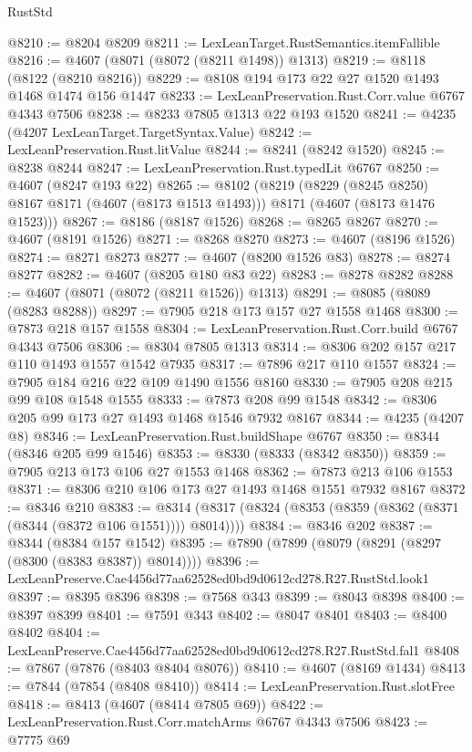 \begin{lexlean}{RustStd}
\begin{coremodule}
@8210 := @8204 @8209
@8211 := LexLeanTarget.RustSemantics.itemFallible
@8216 := @4607 (@8071 (@8072 (@8211 @1498)) @1313)
@8219 := @8118 (@8122 (@8210 @8216))
@8229 := @8108 @194 @173 @22 @27 @1520 @1493 @1468 @1474 @156 @1447
@8233 := LexLeanPreservation.Rust.Corr.value @6767 @4343 @7506
@8238 := @8233 @7805 @1313 @22 @193 @1520
@8241 := @4235 (@4207 LexLeanTarget.TargetSyntax.Value)
@8242 := LexLeanPreservation.Rust.litValue
@8244 := @8241 (@8242 @1520)
@8245 := @8238 @8244
@8247 := LexLeanPreservation.Rust.typedLit @6767
@8250 := @4607 (@8247 @193 @22)
@8265 := @8102
    (@8219
      (@8229 (@8245 @8250) @8167 @8171 (@4607 (@8173 @1513 @1493)))
      @8171
      (@4607 (@8173 @1476 @1523)))
@8267 := @8186 (@8187 @1526)
@8268 := @8265 @8267
@8270 := @4607 (@8191 @1526)
@8271 := @8268 @8270
@8273 := @4607 (@8196 @1526)
@8274 := @8271 @8273
@8277 := @4607 (@8200 @1526 @83)
@8278 := @8274 @8277
@8282 := @4607 (@8205 @180 @83 @22)
@8283 := @8278 @8282
@8288 := @4607 (@8071 (@8072 (@8211 @1526)) @1313)
@8291 := @8085 (@8089 (@8283 @8288))
@8297 := @7905 @218 @173 @157 @27 @1558 @1468
@8300 := @7873 @218 @157 @1558
@8304 := LexLeanPreservation.Rust.Corr.build @6767 @4343 @7506
@8306 := @8304 @7805 @1313
@8314 := @8306 @202 @157 @217 @110 @1493 @1557 @1542 @7935
@8317 := @7896 @217 @110 @1557
@8324 := @7905 @184 @216 @22 @109 @1490 @1556 @8160
@8330 := @7905 @208 @215 @99 @108 @1548 @1555
@8333 := @7873 @208 @99 @1548
@8342 := @8306 @205 @99 @173 @27 @1493 @1468 @1546 @7932 @8167
@8344 := @4235 (@4207 @8)
@8346 := LexLeanPreservation.Rust.buildShape @6767
@8350 := @8344 (@8346 @205 @99 @1546)
@8353 := @8330 (@8333 (@8342 @8350))
@8359 := @7905 @213 @173 @106 @27 @1553 @1468
@8362 := @7873 @213 @106 @1553
@8371 := @8306 @210 @106 @173 @27 @1493 @1468 @1551 @7932 @8167
@8372 := @8346 @210
@8383 := @8314 (@8317 (@8324 (@8353 (@8359 (@8362 (@8371 (@8344 (@8372 @106 @1551)))) @8014))))
@8384 := @8346 @202
@8387 := @8344 (@8384 @157 @1542)
@8395 := @7890 (@7899 (@8079 (@8291 (@8297 (@8300 (@8383 @8387)) @8014))))
@8396 := LexLeanPreserve.Cae4456d77aa62528ed0bd9d0612cd278.R27.RustStd.look1
@8397 := @8395 @8396
@8398 := @7568 @343
@8399 := @8043 @8398
@8400 := @8397 @8399
@8401 := @7591 @343
@8402 := @8047 @8401
@8403 := @8400 @8402
@8404 := LexLeanPreserve.Cae4456d77aa62528ed0bd9d0612cd278.R27.RustStd.fal1
@8408 := @7867 (@7876 (@8403 @8404 @8076))
@8410 := @4607 (@8169 @1434)
@8413 := @7844 (@7854 (@8408 @8410))
@8414 := LexLeanPreservation.Rust.slotFree
@8418 := @8413 (@4607 (@8414 @7805 @69))
@8422 := LexLeanPreservation.Rust.Corr.matchArms @6767 @4343 @7506
@8423 := @7775 @69

\end{coremodule}
\end{lexlean}
